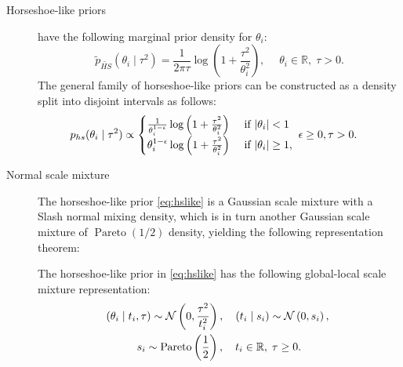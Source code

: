 \documentclass[sts,preprint]{imsart}
\begin{document}
\begin{description}
  \item[Horseshoe-like priors] 
    \citet{bhadra2017horseshoe} have the following marginal prior density for
    $\theta_i$: 
    \begin{equation}
      \tilde p_{\tilde{HS}} (\theta_i \mid \tau^2) = \frac{1}{2 \pi{\tau}}\log
      \left ( 1 + \frac{\tau^2}{\theta_i^2} \right ), \quad  \; \theta_i  \in
      \mathbb{R},\; \tau > 0. \label{eq:hslike}
    \end{equation}
    The general family of horseshoe-like priors can be constructed as a density
    split into disjoint intervals as follows:
    \begin{align}
      p_{hs}(\theta_i \mid \tau^2)&  \propto \begin{cases}
        \frac{1}{\theta_i^{1-\epsilon}}\log \left( 1 + \frac{\tau^2}{\theta_i^2}
          \right) & \text{ if } {\lvert\theta_i\rvert < 1} \\ \theta_i^{1-\epsilon}
          \log \left( 1 + \frac{\tau^2}{\theta_i^2} \right) & \text{ if
        }{\lvert\theta_i\rvert \ge 1}, \\ \end{cases} \; \epsilon \ge 0,\tau > 0.
        \label{eq:split} 
    \end{align}
  \item[Normal scale mixture] 
    The horseshoe-like prior \eqref{eq:hslike} is a Gaussian scale mixture with
    a Slash normal mixing density, which is in turn another Gaussian scale mixture of 
    $\operatorname{Pareto}(1/2)$ density, yielding the following representation
    theorem: 
    \begin{theorem}\label{th:hslike}
      The horseshoe-like prior in \eqref{eq:hslike} has the following global-local
      scale mixture representation:
      \begin{equation}
        \begin{gathered}
          (\theta_i \mid t_i, \tau) 
          \sim {\cal N}\left(0, \frac{\tau^2}{t_i^2} \right)
          ,\quad
          (t_i \mid s_i) 
          \sim {\cal N}\left(0, s_i \right), \; 
          \\
          s_i 
          \sim \operatorname{Pareto}\left( \frac{1}{2} \right), 
          \quad 
          t_i \in \mathbb{R}, \; \tau \ge 0.
        \end{gathered}
        \label{eq:pareto}
      \end{equation}
    \end{theorem}
\end{description}
\end{document}
